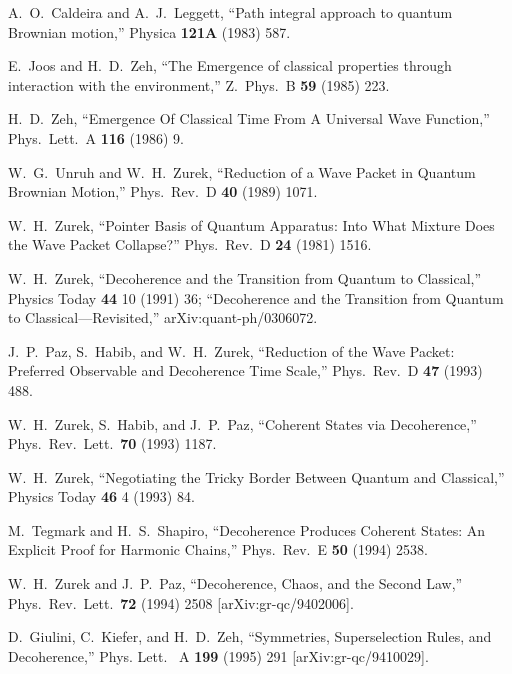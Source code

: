 \documentclass[12pt]{article}
\begin{document}
\begin{thebibliography}{99}
{%
  A.~O.~Caldeira and A.~J.~Leggett,
  ``Path integral approach to quantum Brownian motion,''
  Physica {\bf 121A} (1983) 587.

  E.~Joos and H.~D.~Zeh,
  ``The Emergence of classical properties through interaction with the environment,''
  Z.\ Phys.\ B {\bf 59} (1985) 223.
  
  H.~D.~Zeh,
  ``Emergence Of Classical Time From A Universal Wave Function,''
  Phys.\ Lett.\ A {\bf 116} (1986) 9.
  
  W.~G.~Unruh and W.~H.~Zurek,
  ``Reduction of a Wave Packet in Quantum Brownian Motion,''
  Phys.\ Rev.\ D {\bf 40} (1989) 1071.
 

 W.~H.~Zurek, ``Pointer Basis of Quantum Apparatus:
Into What Mixture Does the Wave Packet Collapse?'' Phys.\ Rev.\ D {\bf
24} (1981) 1516.



 W.~H.~Zurek, ``Decoherence and the Transition from
Quantum to Classical,'' Physics Today {\bf 44} 10 (1991) 36; ``Decoherence and the Transition from Quantum to
Classical---Revisited,'' arXiv:quant-ph/0306072.

 J.~P.~Paz, S.~Habib, and W.~H.~Zurek, ``Reduction of the
Wave Packet: Preferred Observable and Decoherence Time Scale,'' Phys.\
Rev.\ D {\bf 47} (1993) 488.


 W.~H.~Zurek, S.~Habib, and J.~P.~Paz, ``Coherent States
via Decoherence,'' Phys.\ Rev.\ Lett.\ {\bf 70} (1993) 1187.

 W.~H.~Zurek, ``Negotiating the Tricky Border Between
Quantum and Classical,'' Physics Today {\bf 46} 4 (1993) 84.

 M.~Tegmark and H.~S.~Shapiro, ``Decoherence Produces
Coherent States: An Explicit Proof for Harmonic Chains,'' Phys.\ Rev.\ E
{\bf 50} (1994) 2538.

 W.~H.~Zurek and J.~P.~Paz, ``Decoherence, Chaos, and the
Second Law,'' Phys.\ Rev.\ Lett.\ {\bf 72} (1994) 2508
[arXiv:gr-qc/9402006].

 D.~Giulini, C.~Kiefer, and H.~D.~Zeh, ``Symmetries,
Superselection Rules, and Decoherence,'' Phys. Lett. \ A {\bf 199}
 (1995) 291 [arXiv:gr-qc/9410029].

}
\end{thebibliography}
\end{document}
